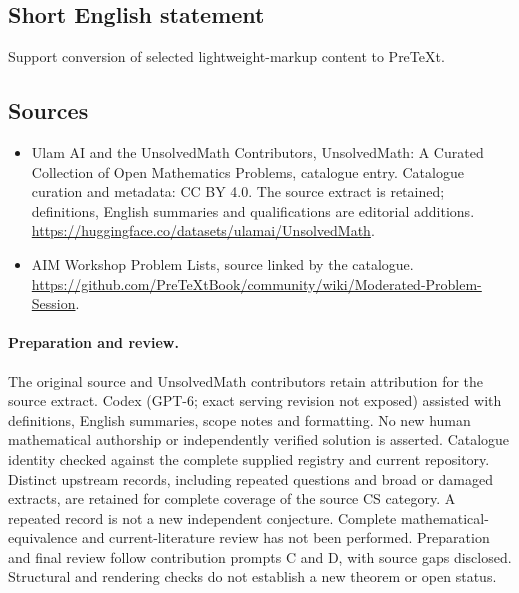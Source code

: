 \documentclass[11pt]{article}
\begin{document}
\subsection{Short English statement}
Support conversion of selected lightweight-markup content to PreTeXt.
\subsection{Sources}
\begin{itemize}
\item[\hypertarget{source:statement:1}{S1}] Ulam AI and the UnsolvedMath Contributors, UnsolvedMath: A Curated Collection of Open Mathematics Problems, catalogue entry. Catalogue curation and metadata: CC BY 4.0. The source extract is retained; definitions, English summaries and qualifications are editorial additions.
\url{https://huggingface.co/datasets/ulamai/UnsolvedMath}.
\item[\hypertarget{source:statement:2}{S2}] AIM Workshop Problem Lists, source linked by the catalogue.
\url{https://github.com/PreTeXtBook/community/wiki/Moderated-Problem-Session}.
\end{itemize}
\paragraph{Preparation and review.}
The original source and UnsolvedMath contributors retain attribution for the source extract. Codex (GPT-6; exact serving revision not exposed) assisted with definitions, English summaries, scope notes and formatting. No new human mathematical authorship or independently verified solution is asserted. Catalogue identity checked against the complete supplied registry and current repository. Distinct upstream records, including repeated questions and broad or damaged extracts, are retained for complete coverage of the source CS category. A repeated record is not a new independent conjecture. Complete mathematical-equivalence and current-literature review has not been performed. Preparation and final review follow contribution prompts C and D, with source gaps disclosed. Structural and rendering checks do not establish a new theorem or open status.
\label{end:statement}
\end{document}
